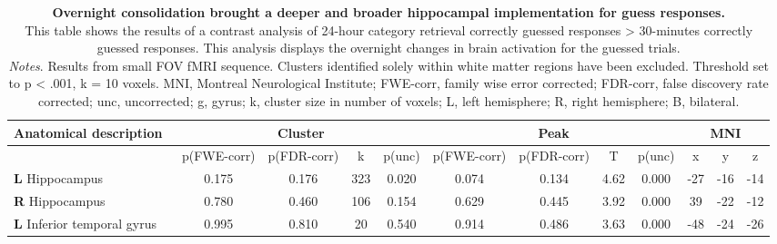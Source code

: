 \begin{landscape}
\begin{table}[!ht]
    \vspace*{-4cm}
    \raggedright
  \begin{tabular}{ll|cccc|cccc|ccc} \\ \hline
        \multicolumn{2}{l}{\textbf{Anatomical description}} & \multicolumn{4}{c}{\textbf{Cluster}} & \multicolumn{4}{c}{\textbf{Peak}} &  \multicolumn{3}{c}{\textbf{MNI}} \\ \hline
        \multicolumn{2}{l}{\textbf{}} & \multicolumn{1}{l}{p(FWE-corr)} & p(FDR-corr) & k & \multicolumn{1}{l}{p(unc)} & p(FWE-corr) & p(FDR-corr) & T & \multicolumn{1}{l}{p(unc)} & x & y & z \\ \hline
        \textbf{L} Hippocampus & & 0.175 & 0.176 & 323 & 0.020 & 0.074 & 0.134 & 4.62 & 0.000 & -27 & -16 & -14 \\
        \textbf{R} Hippocampus & & 0.780 & 0.460 & 106 & 0.154 & 0.629 & 0.445 & 3.92 & 0.000 & 39 & -22 & -12 \\
        \textbf{L} Inferior temporal gyrus & & 0.995 & 0.810 & 20 & 0.540 & 0.914 & 0.486 & 3.63 & 0.000 & -48 & -24 & -26 \\
    \end{tabular}
    \vspace{1.0 em}
    \caption{\textbf{Overnight consolidation brought a deeper and broader hippocampal implementation for guess responses.} \\ This table shows the results of a contrast analysis of 24-hour category retrieval correctly guessed responses > 30-minutes correctly guessed responses.
    This analysis displays the overnight changes in brain activation for the guessed trials.\\ 
    \vspace{1.0 em} \textit{Notes}. Results from small FOV fMRI sequence. Clusters identified solely within white matter regions have been excluded. Threshold set to p < .001, k = 10 voxels. MNI, Montreal Neurological Institute; FWE-corr, family wise error corrected; FDR-corr, false discovery rate corrected; unc, uncorrected; g, gyrus; k, cluster size in number of voxels; L, left hemisphere; R, right hemisphere; B, bilateral.}
    \label{tab:Unc_Ret2_vs_Ret1}
\end{table}
\end{landscape}